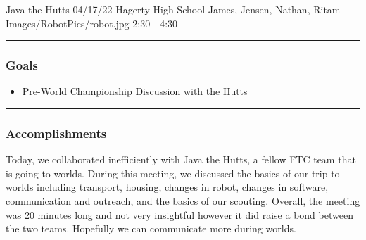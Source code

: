 \insertmeeting 
	{Java the Hutts} 
	{04/17/22} 
	{Hagerty High School}
	{James, Jensen, Nathan, Ritam}
	{Images/RobotPics/robot.jpg}
	{2:30 - 4:30}
	
\noindent\hfil\rule{\textwidth}{.4pt}\hfil
\subsubsection*{Goals}
\begin{itemize}
    \item Pre-World Championship Discussion with the Hutts

\end{itemize} 

\noindent\hfil\rule{\textwidth}{.4pt}\hfil

\subsubsection*{Accomplishments}
Today, we collaborated inefficiently with Java the Hutts, a fellow FTC team that is going to worlds. During this meeting, we discussed the basics of our trip to worlds including transport, housing, changes in robot, changes in software, communication and outreach, and the basics of our scouting. Overall, the meeting was 20 minutes long and not very insightful however it did raise a bond between the two teams. Hopefully we can communicate more during worlds.


	
